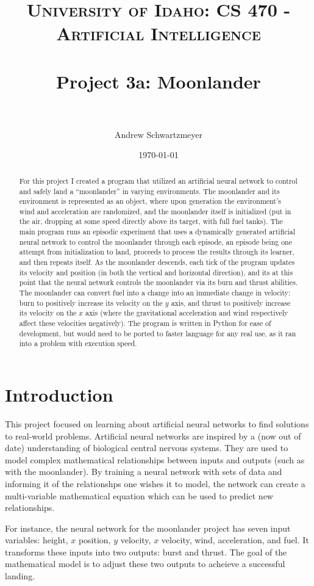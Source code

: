 \documentclass[12pt, article]{scrartcl}
\title{	
\normalfont \normalsize 
\textsc{University of Idaho: CS 470 - Artificial Intelligence} \\ [25pt]
\horrule{0.5pt} \\[0.4cm]
\huge Project 3a: Moonlander\\
\horrule{2pt} \\[0.5cm]
}
\author{Andrew Schwartzmeyer}
\date{\normalsize\today}
\begin{document}
\maketitle 
\begin{abstract}
For this project I created a program that utilized an artificial neural network to control and safely land a ``moonlander'' in varying environments. The moonlander and its environment is represented as an object, where upon generation the environment's wind and acceleration are randomized, and the moonlander itself is initialized (put in the air, dropping at some speed directly above its target, with full fuel tanks). The main program runs an episodic experiment that uses a dynamically generated artificial neural network to control the moonlander through each episode, an episode being one attempt from initialization to land, proceeds to process the results through its learner, and then repeats itself. As the moonlander descends, each tick of the program updates its velocity and position (in both the vertical and horizontal direction), and its at this point that the neural network controls the moonlander via its burn and thrust abilities. The moonlander can convert fuel into a change into an immediate change in velocity: burn to positively increase its velocity on the $y$ axis, and thrust to positively increase its velocity on the $x$ axis (where the gravitational acceleration and wind respectively affect these velocities negatively). The program is written in Python for ease of development, but would need to be ported to faster language for any real use, as it ran into a problem with execution speed.
\end{abstract}
\pagebreak
\section{Introduction}
This project focused on learning about artificial neural networks to find solutions to real-world problems. Artificial neural networks are inspired by a (now out of date) understanding of biological central nervous systems. They are used to model complex mathematical relationships between inputs and outputs (such as with the moonlander). By training a neural network with sets of data and informing it of the relationshps one wishes it to model, the network can create a multi-variable mathematical equation which can be used to predict new relationships.

For instance, the neural network for the moonlander project has seven input variables: height, $x$ position, $y$ velocity, $x$ velocity, wind, acceleration, and fuel. It transforms these inputs into two outputs: burst and thrust. The goal of the mathematical model is to adjust these two outputs to acheieve a successful landing.
\end{document}
